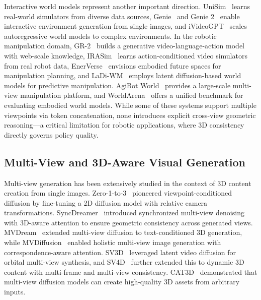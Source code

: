 Interactive world models represent another important direction. UniSim~\cite{yang2023unisim} learns real-world simulators from diverse data sources, Genie~\cite{bruce2024genie} and Genie 2~\cite{parkerholder2024genie2} enable interactive environment generation from single images, and iVideoGPT~\cite{wu2024ivideogpt} scales autoregressive world models to complex environments. In the robotic manipulation domain, GR-2~\cite{cheang2024gr2} builds a generative video-language-action model with web-scale knowledge, IRASim~\cite{zhu2025irasim} learns action-conditioned video simulators from real robot data, EnerVerse~\cite{huang2025enerverse} envisions embodied future spaces for manipulation planning, and LaDi-WM~\cite{huang2025ladiwm} employs latent diffusion-based world models for predictive manipulation. AgiBot World~\cite{bu2025agibotworld} provides a large-scale multi-view manipulation platform, and WorldArena~\cite{shang2026worldarena} offers a unified benchmark for evaluating embodied world models. While some of these systems support multiple viewpoints via token concatenation, none introduces explicit cross-view geometric reasoning---a critical limitation for robotic applications, where 3D consistency directly governs policy quality.

\subsection{Multi-View and 3D-Aware Visual Generation}

Multi-view generation has been extensively studied in the context of 3D content creation from single images. Zero-1-to-3~\cite{liu2023zero123} pioneered viewpoint-conditioned diffusion by fine-tuning a 2D diffusion model with relative camera transformations. SyncDreamer~\cite{liu2023syncdreamer} introduced synchronized multi-view denoising with 3D-aware attention to ensure geometric consistency across generated views. MVDream~\cite{shi2023mvdream} extended multi-view diffusion to text-conditioned 3D generation, while MVDiffusion~\cite{tang2023mvdiffusion} enabled holistic multi-view image generation with correspondence-aware attention. SV3D~\cite{voleti2024sv3d} leveraged latent video diffusion for orbital multi-view synthesis, and SV4D~\cite{xie2024sv4d} further extended this to dynamic 3D content with multi-frame and multi-view consistency. CAT3D~\cite{gao2024cat3d} demonstrated that multi-view diffusion models can create high-quality 3D assets from arbitrary inputs.


